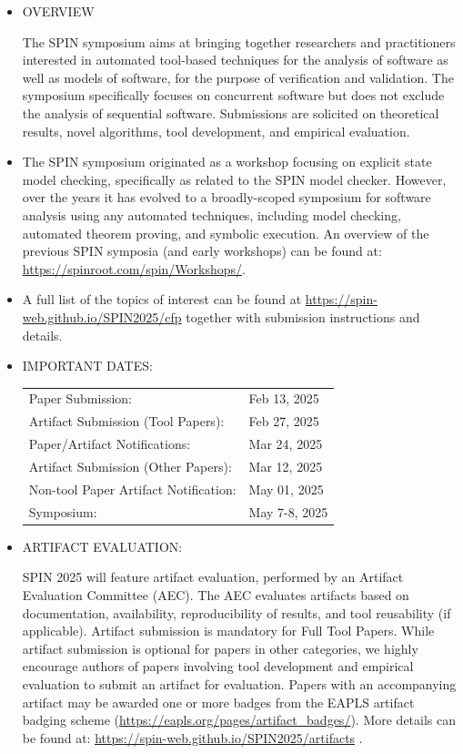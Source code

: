 \documentclass[prodmode,acmtecs]{acmsmall} %
\begin{document}
\begin{itemize}\item  OVERVIEW 
 
  The SPIN symposium aims at bringing together researchers and practitioners interested in automated tool-based techniques for the analysis of software as well as models of software, for the purpose of verification and validation. The symposium specifically focuses on concurrent software but does not exclude the analysis of sequential software. Submissions are solicited on theoretical results, novel algorithms, tool development, and empirical evaluation.  
 
\item  The SPIN symposium originated as a workshop focusing on explicit state model checking, specifically as related to the SPIN model checker. However, over the years it has evolved to a broadly-scoped symposium for software analysis using any automated techniques, including model checking, automated theorem proving, and symbolic execution. An overview of the previous SPIN symposia (and early workshops) can be found at: \href{https://spinroot.com/spin/Workshops/}{https://spinroot.com/spin/Workshops/}. 
 
\item  A full list of the topics of interest can be found at \href{https://spin-web.github.io/SPIN2025/cfp}{https://spin-web.github.io/SPIN2025/cfp} together with submission instructions and details.  
 
\item  IMPORTANT DATES:  
 
\begin{tabulary}{\linewidth}{LL}Paper Submission:  & Feb 13, 2025 \\
Artifact Submission (Tool Papers):  & Feb 27, 2025 \\
Paper/Artifact Notifications:  & Mar 24, 2025 \\
Artifact Submission (Other Papers):  & Mar 12, 2025 \\
Non-tool Paper Artifact Notification:  & May 01, 2025 \\
Symposium:  & May 7-8, 2025 \\
\end{tabulary}
 
\item  ARTIFACT EVALUATION: 
 
  SPIN 2025 will feature artifact evaluation, performed by an Artifact Evaluation Committee (AEC). The AEC evaluates artifacts based on documentation, availability, reproducibility of results, and tool reusability (if applicable). Artifact submission is mandatory for Full Tool Papers. While artifact submission is optional for papers in other categories, we highly encourage authors of papers involving tool development and empirical evaluation to submit an artifact for evaluation. Papers with an accompanying artifact may be awarded one or more badges from the EAPLS artifact badging scheme (\href{https://eapls.org/pages/artifact_badges/}{https://eapls.org/pages/artifact\_badges/}). More details can be found at: \href{https://spin-web.github.io/SPIN2025/artifacts}{https://spin-web.github.io/SPIN2025/artifacts} . 
 

\end{itemize}
\end{document}

